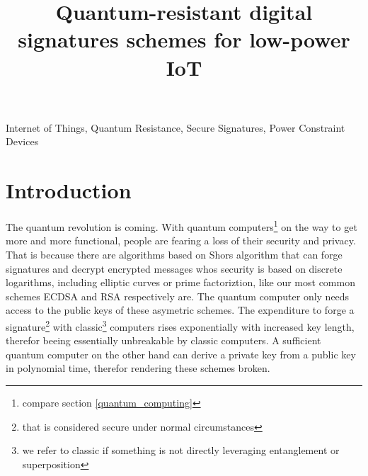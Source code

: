 \documentclass[conference]{IEEEtran}
\begin{document}
\title{Quantum-resistant digital signatures schemes for low-power IoT}

\author{
}

\maketitle

\begin{abstract}
\end{abstract}

\begin{IEEEkeywords}
Internet of Things, Quantum Resistance, Secure Signatures, Power Constraint Devices
\end{IEEEkeywords}


\section{Introduction}
The quantum revolution is coming. With quantum computers\footnote{compare section \ref{quantum_computing}} on the way to get more and more functional, people are fearing a loss of their security and privacy.
That is because there are algorithms based on Shors algorithm that can forge signatures and decrypt encrypted messages whos security is based on discrete logarithms, including elliptic curves or prime factoriztion, like our most common schemes ECDSA and RSA respectively are.
The quantum computer only needs access to the public keys of these asymetric schemes.
The expenditure to forge a signature\footnote{that is considered secure under normal circumstances 
} with classic\footnote{we refer to classic if something is not directly leveraging entanglement or superposition} computers rises exponentially with increased key length, therefor beeing essentially unbreakable by classic computers.
A sufficient quantum computer on the other hand can derive a private key from a public key in polynomial time, therefor rendering these schemes broken.
\end{document}
